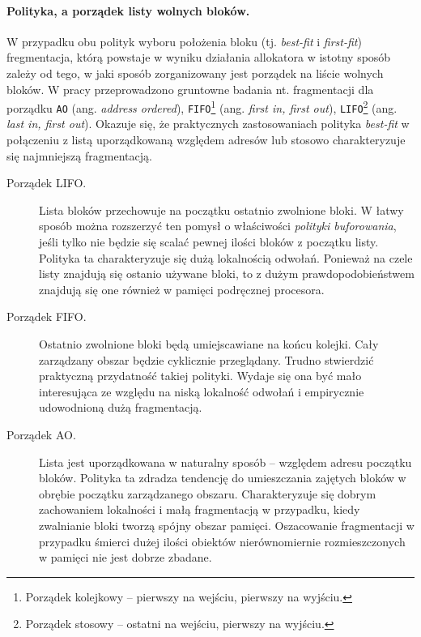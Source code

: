 \documentclass[12pt,a4paper,titlepage,twoside]{mwart}
\begin{document}
\paragraph{Polityka, a porządek listy wolnych bloków.}

W przypadku obu polityk wyboru położenia bloku (tj. \textit{best-fit} i
\textit{first-fit}) fregmentacja, którą powstaje w wyniku działania allokatora
w istotny sposób zależy od tego, w jaki sposób zorganizowany jest porządek na
liście wolnych bloków. W pracy \cite{johnstone98memory} przeprowadzono
gruntowne badania nt.  fragmentacji dla porządku \texttt{AO} (ang.
\textit{address ordered}), \texttt{FIFO}\footnote{Porządek kolejkowy --
pierwszy na wejściu, pierwszy na wyjściu.} (ang.  \textit{first in, first
out}), \texttt{LIFO}\footnote{Porządek stosowy -- ostatni na wejściu, pierwszy
na wyjściu.} (ang.  \textit{last in, first out}). Okazuje się, że praktycznych
zastosowaniach polityka \textit{best-fit} w połączeniu z listą uporządkowaną
względem adresów lub stosowo charakteryzuje się najmniejszą fragmentacją.
\vspace{-1ex}

\begin{description}

\item[Porządek LIFO.] Lista bloków przechowuje na początku ostatnio zwolnione
bloki. W łatwy sposób można rozszerzyć ten pomysł o właściwości
\textit{polityki buforowania}, jeśli tylko nie będzie się scalać pewnej ilości
bloków z początku listy. Polityka ta charakteryzuje się dużą lokalnością
odwołań. Ponieważ na czele listy znajdują się ostanio używane bloki, to z dużym
prawdopodobieństwem znajdują się one również w pamięci podręcznej procesora.

\vspace{1ex}

\item[Porządek FIFO.] Ostatnio zwolnione bloki będą umiejscawiane na końcu
kolejki. Cały zarządzany obszar będzie cyklicznie przeglądany. Trudno
stwierdzić praktyczną przydatność takiej polityki. Wydaje się ona być mało
interesująca ze względu na niską lokalność odwołań i empirycznie udowodnioną
dużą fragmentacją.

\vspace{1ex}

\item[Porządek AO.] Lista jest uporządkowana w naturalny sposób -- względem
adresu początku bloków. Polityka ta zdradza tendencję do umieszczania zajętych
bloków w obrębie początku zarządzanego obszaru. Charakteryzuje się dobrym
zachowaniem lokalności i małą fragmentacją w przypadku, kiedy zwalnianie bloki
tworzą spójny obszar pamięci. Oszacowanie fragmentacji w przypadku śmierci
dużej ilości obiektów nierównomiernie rozmieszczonych w pamięci nie jest dobrze
zbadane.
\end{description}
\end{document}
